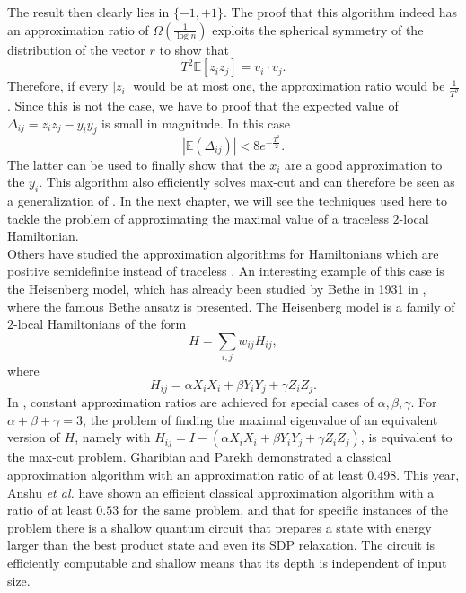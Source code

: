 The result then clearly lies in $ \{-1,+1\} $.
The proof that this algorithm indeed has an approximation ratio of $\Omega(\frac{1}{\log{}n})$ exploits the spherical symmetry of the distribution of the vector $r$ to show that \[
T^2\mathbb{E}\left[ z_iz_j \right] = v_i\cdot v_j
.\]
Therefore, if every $\left| z_i \right| $ would be at most one, the approximation ratio would be $\frac{1}{T^2}$.
Since this is not the case, we have to proof that the expected value of $\Delta_{ij}=z_iz_j - y_iy_j$ is small in magnitude.
In this case \[
	\left|\mathbb{E}(\Delta_{ij})\right|<8e^{-\frac{T^2}{2}}
.\]
The latter can be used to finally show that the $x_i$ are a good approximation to the $y_i$.
This algorithm also efficiently solves max-cut and can therefore be seen as a generalization of \cite{goemans95}.
In the next chapter, we will see the techniques used here to tackle the problem of approximating the maximal value of a traceless $2$-local Hamiltonian.\\
Others have studied the approximation algorithms for Hamiltonians which are positive semidefinite instead of traceless \cite{gharibian19,anshu20,brandao14}.
An interesting example of this case is the Heisenberg model, which has already been studied by Bethe in 1931 in \cite{bethe31}, where the famous Bethe ansatz is presented.
The Heisenberg model is a family of $2$-local Hamiltonians of the form \[
H=\sum_{i,j} w_{ij}H_{ij}
,\] where \[
H_{ij}=\alpha X_iX_i + \beta Y_iY_j + \gamma Z_iZ_j
.\]
In \cite{gharibian19}, constant approximation ratios are achieved for special cases of $\alpha, \beta, \gamma$.
For $\alpha+\beta+\gamma=3$, the problem of finding the maximal eigenvalue of an equivalent version of $H$, namely with  $H_{ij}=I-(\alpha X_iX_i + \beta Y_iY_j + \gamma Z_iZ_j)$, is equivalent to the max-cut problem.
Gharibian and Parekh demonstrated a classical approximation algorithm with an approximation ratio of at least $0.498$.
This year, Anshu \emph{et al.}\cite{anshu20} have shown an efficient classical approximation algorithm with a ratio of at least $0.53$ for the same problem, and that for specific instances of the problem there is a shallow quantum circuit that prepares a state with energy larger than the best product state and even its SDP relaxation.
The circuit is efficiently computable and shallow means that its depth is independent of input size.
